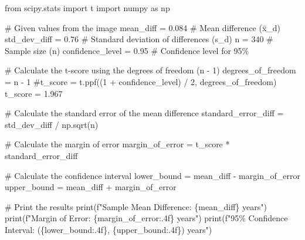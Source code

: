 \documentclass[
  letterpaper,
  DIV=11,
  numbers=noendperiod]{scrartcl}
\newenvironment{Shaded}{\begin{snugshade}}{\end{snugshade}}
\newcommand{\BuiltInTok}[1]{\textcolor[rgb]{0.00,0.23,0.31}{#1}}
\newcommand{\CommentTok}[1]{\textcolor[rgb]{0.37,0.37,0.37}{#1}}
\newcommand{\DecValTok}[1]{\textcolor[rgb]{0.68,0.00,0.00}{#1}}
\newcommand{\FloatTok}[1]{\textcolor[rgb]{0.68,0.00,0.00}{#1}}
\newcommand{\ImportTok}[1]{\textcolor[rgb]{0.00,0.46,0.62}{#1}}
\newcommand{\NormalTok}[1]{\textcolor[rgb]{0.00,0.23,0.31}{#1}}
\newcommand{\OperatorTok}[1]{\textcolor[rgb]{0.37,0.37,0.37}{#1}}
\newcommand{\SpecialCharTok}[1]{\textcolor[rgb]{0.37,0.37,0.37}{#1}}
\newcommand{\SpecialStringTok}[1]{\textcolor[rgb]{0.13,0.47,0.30}{#1}}
\begin{document}
\begin{Shaded}
\begin{Highlighting}[]
\ImportTok{from}\NormalTok{ scipy.stats }\ImportTok{import}\NormalTok{ t}
\ImportTok{import}\NormalTok{ numpy }\ImportTok{as}\NormalTok{ np}

\CommentTok{\# Given values from the image}
\NormalTok{mean\_diff }\OperatorTok{=} \FloatTok{0.084}  \CommentTok{\# Mean difference (x̄\_d)}
\NormalTok{std\_dev\_diff }\OperatorTok{=} \FloatTok{0.76}  \CommentTok{\# Standard deviation of differences (s\_d)}
\NormalTok{n }\OperatorTok{=} \DecValTok{340}  \CommentTok{\# Sample size (n)}
\NormalTok{confidence\_level }\OperatorTok{=} \FloatTok{0.95}  \CommentTok{\# Confidence level for 95\%}

\CommentTok{\# Calculate the t{-}score using the degrees of freedom (n {-} 1)}
\NormalTok{degrees\_of\_freedom }\OperatorTok{=}\NormalTok{ n }\OperatorTok{{-}} \DecValTok{1}
\CommentTok{\#t\_score = t.ppf((1 + confidence\_level) / 2, degrees\_of\_freedom)}
\NormalTok{t\_score }\OperatorTok{=} \FloatTok{1.967}

\CommentTok{\# Calculate the standard error of the mean difference}
\NormalTok{standard\_error\_diff }\OperatorTok{=}\NormalTok{ std\_dev\_diff }\OperatorTok{/}\NormalTok{ np.sqrt(n)}

\CommentTok{\# Calculate the margin of error}
\NormalTok{margin\_of\_error }\OperatorTok{=}\NormalTok{ t\_score }\OperatorTok{*}\NormalTok{ standard\_error\_diff}

\CommentTok{\# Calculate the confidence interval}
\NormalTok{lower\_bound }\OperatorTok{=}\NormalTok{ mean\_diff }\OperatorTok{{-}}\NormalTok{ margin\_of\_error}
\NormalTok{upper\_bound }\OperatorTok{=}\NormalTok{ mean\_diff }\OperatorTok{+}\NormalTok{ margin\_of\_error}

\CommentTok{\# Print the results}
\BuiltInTok{print}\NormalTok{(}\SpecialStringTok{f"Sample Mean Difference: }\SpecialCharTok{\{}\NormalTok{mean\_diff}\SpecialCharTok{\}}\SpecialStringTok{ years"}\NormalTok{)}
\BuiltInTok{print}\NormalTok{(}\SpecialStringTok{f"Margin of Error: }\SpecialCharTok{\{}\NormalTok{margin\_of\_error}\SpecialCharTok{:.4f\}}\SpecialStringTok{ years"}\NormalTok{)}
\BuiltInTok{print}\NormalTok{(}\SpecialStringTok{f"95\% Confidence Interval: (}\SpecialCharTok{\{}\NormalTok{lower\_bound}\SpecialCharTok{:.4f\}}\SpecialStringTok{, }\SpecialCharTok{\{}\NormalTok{upper\_bound}\SpecialCharTok{:.4f\}}\SpecialStringTok{) years"}\NormalTok{)}
\end{Highlighting}
\end{Shaded}
\end{document}

